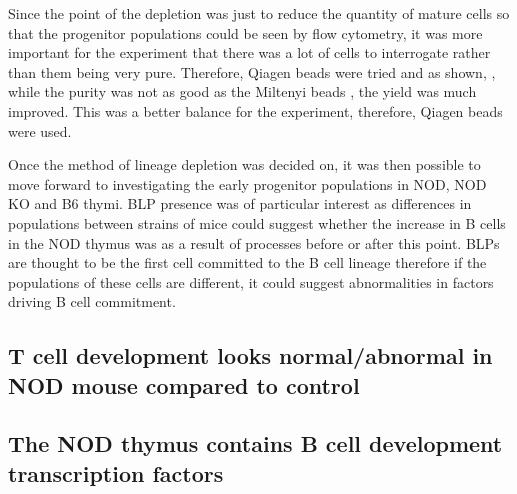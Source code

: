 Since the point of the depletion was just to reduce the quantity of mature cells so that the progenitor populations could be seen by flow cytometry, it was more important for the experiment that there was a lot of cells to interrogate rather than them being very pure.
Therefore, Qiagen beads were tried and as shown, , while the purity was not as good as the Miltenyi beads , the yield was much improved.
This was a better balance for the experiment, therefore, Qiagen beads were used.

Once the method of lineage depletion was decided on, it was then possible to move forward to investigating the early progenitor populations in NOD, NOD KO and B6 thymi.
BLP presence was of particular interest as differences in populations between strains of mice could suggest whether the increase in B cells in the NOD thymus was as a result of processes before or after this point.
BLPs are thought to be the first cell committed to the B cell lineage therefore if the populations of these cells are different, it could suggest abnormalities in factors driving B cell commitment.



\subsection{T cell development looks normal/abnormal in NOD mouse compared to control}

\subsection{The NOD thymus contains B cell development transcription factors}

